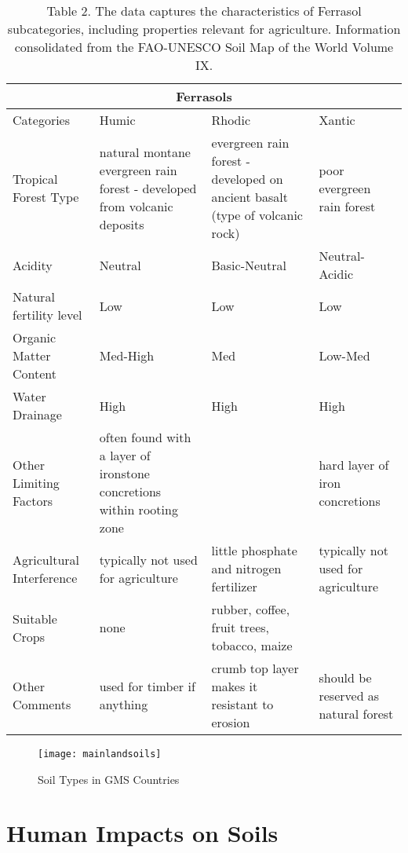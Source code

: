 \begin{table}
\begin{center}   
    \begin{tabular}{ | p{5cm} | p{3cm} | p{3cm} | p{3cm} |}
    \hline
    \multicolumn{4}{|c|}{Ferrasols} \\
    \hline
    Categories & Humic & Rhodic & Xantic \\ \hline
    Tropical Forest Type & natural montane evergreen rain forest - developed from volcanic deposits & evergreen rain forest - developed on ancient basalt (type of volcanic rock) & poor evergreen rain forest\\ \hline
    Acidity & Neutral & Basic-Neutral & Neutral-Acidic \\ \hline
    Natural fertility level & Low & Low & Low \\ \hline
    Organic Matter Content & Med-High & Med & Low-Med \\ \hline
    Water Drainage & High & High & High \\ \hline
    Other Limiting Factors & often found with a layer of ironstone concretions within rooting zone & & hard layer of iron concretions\\ \hline
    Agricultural Interference & typically not used for agriculture & little phosphate and nitrogen fertilizer & typically not used for agriculture\\ \hline
    Suitable Crops & none & rubber, coffee, fruit trees, tobacco, maize & \\ \hline
    Other Comments & used for timber if anything & crumb top layer makes it resistant to erosion & should be reserved as natural forest\\ 
    \hline
    \end{tabular}
    \caption{Table 2. The data captures the characteristics of Ferrasol subcategories, including properties relevant for agriculture. Information consolidated from the FAO-UNESCO Soil Map of the World Volume IX.}
\end{center}
\end{table}

\begin{figure}
\texttt{[image: mainlandsoils]}
\caption{Soil Types in GMS Countries}
\label{fig:mainlandsoils}
\end{figure}


\section{Human Impacts on Soils}

